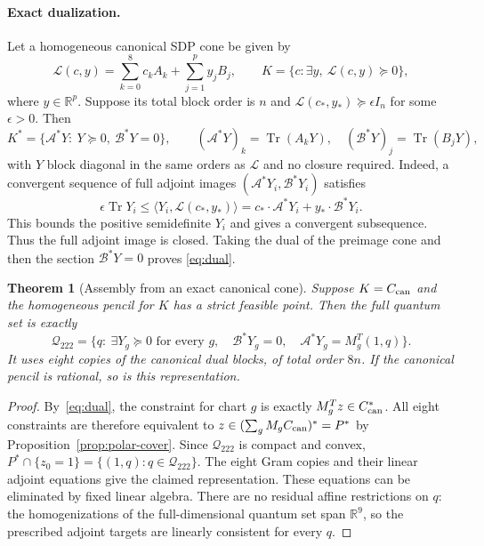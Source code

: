 \documentclass[11pt]{article}
\newtheorem{theorem}[proposition]{Theorem}
\newcommand{\R}{\mathbb R}
\begin{document}
\paragraph{Exact dualization.}
Let a homogeneous canonical SDP cone be given by
\[
 \mathcal L(c,y)=\sum_{k=0}^8c_k A_k+\sum_{j=1}^{p}y_j B_j,
 \qquad K=\{c:\exists y,\ \mathcal L(c,y)\succeq0\},
\]
where $y\in\R^p$. Suppose its total block order is $n$ and
$\mathcal L(c_*,y_*)\succeq\epsilon I_n$ for some $\epsilon>0$.
Then
\begin{equation}
 K^*=\{\mathcal A^*Y:\ Y\succeq0,\ \mathcal B^*Y=0\},\qquad
 (\mathcal A^*Y)_k=\operatorname{Tr}(A_kY),\quad
 (\mathcal B^*Y)_j=\operatorname{Tr}(B_jY),              \label{eq:dual}
\end{equation}
with $Y$ block diagonal in the same orders as $\mathcal L$ and no closure required.
Indeed, a convergent sequence of full adjoint images
$(\mathcal A^*Y_i,\mathcal B^*Y_i)$ satisfies
\[
 \epsilon\operatorname{Tr}Y_i
 \le\langle Y_i,\mathcal L(c_*,y_*)\rangle
 =c_*\cdot\mathcal A^*Y_i+y_*\cdot\mathcal B^*Y_i.
\]
This bounds the positive semidefinite $Y_i$ and gives a convergent
subsequence. Thus the full adjoint image is closed. Taking the dual
of the preimage cone and then the section $\mathcal B^*Y=0$ proves
\eqref{eq:dual}.

\begin{theorem}[Assembly from an exact canonical cone]\label{thm:conditional}
Suppose $K=C_{\rm can}$ and the homogeneous pencil for $K$ has a strict
feasible point. Then the full quantum set is exactly
\begin{equation}
 \mathcal Q_{222}=\{q:\ \exists Y_g\succeq0\text{ for every }g,\quad
       \mathcal B^*Y_g=0,\quad\mathcal A^*Y_g=M_g^T(1,q)\}.
                                                               \label{eq:generic-primal}
\end{equation}
It uses eight copies of the canonical dual blocks, of total order $8n$.
If the canonical pencil is rational, so is this representation.
\end{theorem}
\begin{proof}
By~\eqref{eq:dual}, the constraint for chart $g$ is exactly
$M_g^Tz\in C_{\rm can}^*$. All eight constraints are therefore equivalent
to $z\in(\sum_gM_gC_{\rm can})^*=P^*$ by
Proposition~\ref{prop:polar-cover}. Since $\mathcal Q_{222}$ is compact and
convex, $P^*\cap\{z_0=1\}=\{(1,q):q\in\mathcal Q_{222}\}$.
The eight Gram copies and their linear adjoint equations give the
claimed representation. These equations can be eliminated by fixed
linear algebra. There are no residual affine restrictions on $q$:
the homogenizations of the full-dimensional quantum set span $\R^9$,
so the prescribed adjoint targets are linearly consistent for every $q$.
\end{proof}
\end{document}
